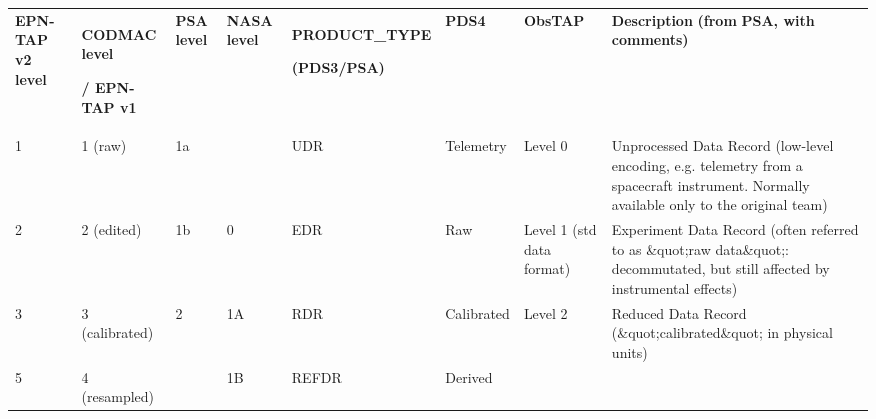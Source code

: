 \documentclass[11pt,a4paper]{ivoa}
\begin{document}
\begin{tabular}{llllllll}
\sptablerule
\textbf{EPN-TAP v2} \textbf{level}

&\textbf{CODMAC} \textbf{level }

\textbf{/ EPN-TAP v1}

&\textbf{PSA} \textbf{level}

&\textbf{NASA} \textbf{level}

&\textbf{PRODUCT\_TYPE }

\textbf{(PDS3/PSA)}

&\textbf{PDS4}&\textbf{ObsTAP}

&\textbf{Description}  \textbf{(from} \textbf{PSA, with comments)}

\\
\sptablerule

1 

&1  (raw)

&1a

& 

&UDR

&Telemetry&Level 0

&Unprocessed Data Record  (low-level encoding, e.g. telemetry from a spacecraft instrument. Normally available only to the original team)

\\
2 

&2  (edited)

&1b

&0

&EDR

&Raw&Level 1  (std data format)

&Experiment Data Record  (often referred to as \&quot;raw data\&quot;: decommutated, but still affected by instrumental effects)

\\
3 

&3  (calibrated)

&2

&1A

&RDR

&Calibrated&Level 2

&Reduced Data Record  (\&quot;calibrated\&quot; in physical units)

\\
5

&4  (resampled)

& 

&1B

&REFDR

&Derived& 


\end{tabular}
\end{document}
